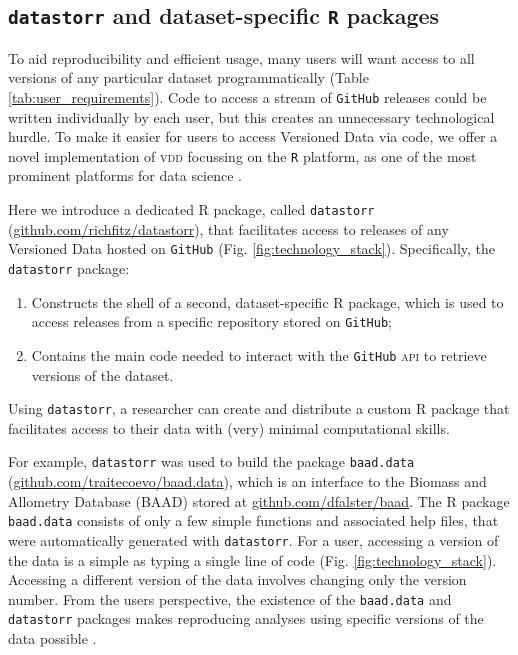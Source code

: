 \documentclass[a4paper,11pt]{article}
\newcommand{\smurl}[1]{{\footnotesize\url{#1}}}
\begin{document}
\subsection{\texttt{datastorr} and dataset-specific \texttt{R} packages}

To aid reproducibility and efficient usage, many users will want access to all versions of any particular dataset programmatically (Table \ref{tab:user_requirements}). Code to access a stream of \texttt{GitHub} releases could be written individually by each user, but this creates an unnecessary technological hurdle. To make it easier for users to access Versioned Data via code, we offer a novel implementation of \textsc{vdd} focussing on the \texttt{R} platform, as one of the most prominent platforms for data science \citep{R-2017}.

Here we introduce a dedicated \textsc{R} package, called \texttt{datastorr} (\smurl{github.com/richfitz/datastorr}), that facilitates access to releases of any Versioned Data hosted on \texttt{GitHub} (Fig. \ref{fig:technology_stack}). Specifically, the  \texttt{datastorr} package:
\begin{enumerate}
  \item Constructs the shell of a second, dataset-specific \textsc{R} package, which is used to access releases from a specific repository stored on \texttt{GitHub};
  \item Contains the main code needed to interact with the \texttt{GitHub} \textsc{api} to retrieve versions of the dataset.
\end{enumerate}
Using \texttt{datastorr}, a researcher can create and distribute a custom \textsc{R} package that facilitates access to their data with (very) minimal computational skills.

For example, \texttt{datastorr} was used to build the package \texttt{baad.data} (\smurl{github.com/traitecoevo/baad.data}), which is an interface to the Biomass and Allometry Database (\textsc{BAAD}) \citep{Falster-2015} stored at \smurl{github.com/dfalster/baad}. The R package \texttt{baad.data} consists of only a few simple functions and associated help files, that were automatically generated with \texttt{datastorr}. For a user, accessing a version of the data is a simple as typing a single line of code (Fig. \ref{fig:technology_stack}). Accessing a different version of the data involves changing only the version number. From the users perspective, the existence of the \texttt{baad.data} and \texttt{datastorr} packages makes reproducing analyses using specific versions of the data possible \citep[e.g.][]{Duursma-2016,Falster-2016}.
\end{document}
